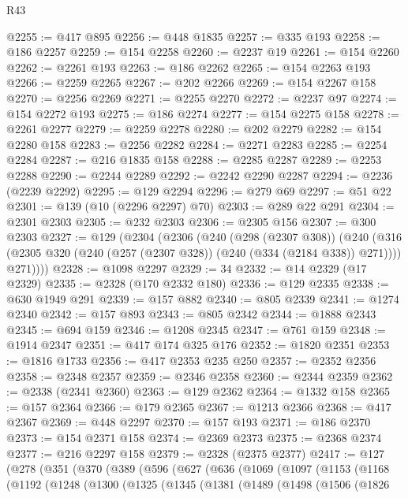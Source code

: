 \begin{lexlean}{R43}
\begin{coremodule}
@2255 := @417 @895
@2256 := @448 @1835
@2257 := @335 @193
@2258 := @186 @2257
@2259 := @154 @2258
@2260 := @2237 @19
@2261 := @154 @2260
@2262 := @2261 @193
@2263 := @186 @2262
@2265 := @154 @2263 @193
@2266 := @2259 @2265
@2267 := @202 @2266
@2269 := @154 @2267 @158
@2270 := @2256 @2269
@2271 := @2255 @2270
@2272 := @2237 @97
@2274 := @154 @2272 @193
@2275 := @186 @2274
@2277 := @154 @2275 @158
@2278 := @2261 @2277
@2279 := @2259 @2278
@2280 := @202 @2279
@2282 := @154 @2280 @158
@2283 := @2256 @2282
@2284 := @2271 @2283
@2285 := @2254 @2284
@2287 := @216 @1835 @158
@2288 := @2285 @2287
@2289 := @2253 @2288
@2290 := @2244 @2289
@2292 := @2242 @2290 @2287
@2294 := @2236 (@2239 @2292)
@2295 := @129 @2294
@2296 := @279 @69
@2297 := @51 @22
@2301 := @139 (@10 (@2296 @2297) @70)
@2303 := @289 @22 @291
@2304 := @2301 @2303
@2305 := @232 @2303
@2306 := @2305 @156
@2307 := @300 @2303
@2327 := @129
    (@2304
      (@2306
        (@240
          (@298 (@2307 @308))
          (@240
            (@316 (@2305 @320 (@240 (@257 (@2307 @328)) (@240 (@334 (@2184 @338)) @271))))
            @271))))
@2328 := @1098 @2297
@2329 := 34
@2332 := @14 @2329 (@17 @2329)
@2335 := @2328 (@170 @2332 @180)
@2336 := @129 @2335
@2338 := @630 @1949 @291
@2339 := @157 @882
@2340 := @805 @2339
@2341 := @1274 @2340
@2342 := @157 @893
@2343 := @805 @2342
@2344 := @1888 @2343
@2345 := @694 @159
@2346 := @1208 @2345
@2347 := @761 @159
@2348 := @1914 @2347
@2351 := @417 @174 @325 @176
@2352 := @1820 @2351
@2353 := @1816 @1733
@2356 := @417 @2353 @235 @250
@2357 := @2352 @2356
@2358 := @2348 @2357
@2359 := @2346 @2358
@2360 := @2344 @2359
@2362 := @2338 (@2341 @2360)
@2363 := @129 @2362
@2364 := @1332 @158
@2365 := @157 @2364
@2366 := @179 @2365
@2367 := @1213 @2366
@2368 := @417 @2367
@2369 := @448 @2297
@2370 := @157 @193
@2371 := @186 @2370
@2373 := @154 @2371 @158
@2374 := @2369 @2373
@2375 := @2368 @2374
@2377 := @216 @2297 @158
@2379 := @2328 (@2375 @2377)
@2417 := @127
    (@278
      (@351
        (@370
          (@389
            (@596
              (@627
                (@636
                  (@1069
                    (@1097
                      (@1153
                        (@1168
                          (@1192
                            (@1248
                              (@1300
                                (@1325
                                  (@1345
                                    (@1381
                                      (@1489
                                        (@1498
                                          (@1506
                                            (@1826

\end{coremodule}
\end{lexlean}
